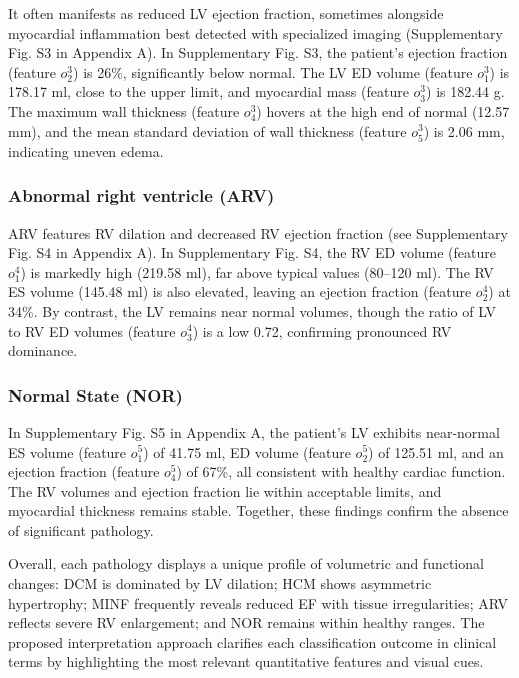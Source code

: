 \documentclass[fleqn,10pt]{wlscirep}
\begin{document}
It often manifests as reduced LV ejection fraction, sometimes alongside myocardial inflammation best detected with specialized imaging (Supplementary Fig. S3 in Appendix A). In Supplementary Fig. S3, the patient's ejection fraction (feature \(o_2^3\)) is 26\%, significantly below normal. The LV ED volume (feature \(o_1^3\)) is 178.17 ml, close to the upper limit, and myocardial mass (feature \(o_3^3\)) is 182.44 g. The maximum wall thickness (feature \(o_4^3\)) hovers at the high end of normal (12.57 mm), and the mean standard deviation of wall thickness (feature \(o_5^3\)) is 2.06 mm, indicating uneven edema.

\subsubsection*{Abnormal right ventricle (ARV)}

ARV features RV dilation and decreased RV ejection fraction (see Supplementary Fig. S4 in Appendix A). In Supplementary Fig. S4, the RV ED volume (feature \(o_1^4\)) is markedly high (219.58 ml), far above typical values (80--120 ml). The RV ES volume (145.48 ml) is also elevated, leaving an ejection fraction (feature \(o_2^4\)) at 34\%. By contrast, the LV remains near normal volumes, though the ratio of LV to RV ED volumes (feature \(o_3^4\)) is a low 0.72, confirming pronounced RV dominance.

\subsubsection*{Normal State (NOR)}

In Supplementary Fig. S5 in Appendix A, the patient's LV exhibits near-normal ES volume (feature \(o_1^5\)) of 41.75 ml, ED volume (feature \(o_2^5\)) of 125.51 ml, and an ejection fraction (feature \(o_4^5\)) of 67\%, all consistent with healthy cardiac function. The RV volumes and ejection fraction lie within acceptable limits, and myocardial thickness remains stable. Together, these findings confirm the absence of significant pathology.

Overall, each pathology displays a unique profile of volumetric and functional changes: DCM is dominated by LV dilation; HCM shows asymmetric hypertrophy; MINF frequently reveals reduced EF with tissue irregularities; ARV reflects severe RV enlargement; and NOR remains within healthy ranges. The proposed interpretation approach clarifies each classification outcome in clinical terms by highlighting the most relevant quantitative features and visual cues.
\end{document}
